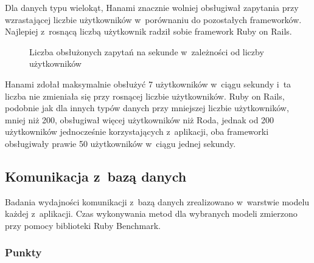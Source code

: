 \documentclass[archivemode]{mgr}
\begin{document}
Dla danych typu wielokąt, Hanami znacznie wolniej obsługiwał zapytania przy wzrastającej liczbie użytkowników w~porównaniu do pozostałych frameworków. Najlepiej z~rosnącą liczbą użytkownik radził sobie framework Ruby on Rails.

\begin{figure}[H]
  \centering
  \caption{Liczba obsłużonych zapytań na sekunde w~zależności od liczby użytkowników}
  \label{fig:load_rps_polygon}
\end{figure}

Hanami zdołał maksymalnie obsłużyć 7 użytkowników w~ciągu sekundy i~ta liczba nie zmieniała się przy rosnącej liczbie użytkowników. Ruby on Rails, podobnie jak dla innych typów danych przy mniejszej liczbie użytkowników, mniej niż 200, obsługiwał więcej użytkowników niż Roda, jednak od 200 użytkowników jednocześnie korzystających z~aplikacji, oba frameworki obsługiwały prawie 50 użytkowników w~ciągu jednej sekundy.

\subsection{Komunikacja z~bazą danych}

Badania wydajności komunikacji z~bazą danych zrealizowano w~warstwie modelu każdej z~aplikacji. Czas wykonywania metod dla wybranych modeli zmierzono przy pomocy biblioteki Ruby Benchmark.

\subsubsection{Punkty}
\end{document}
